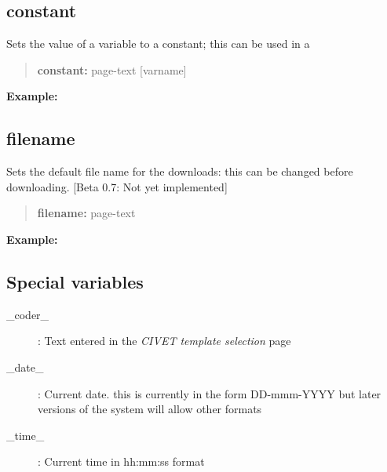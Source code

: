 \documentclass[letterpaper,10pt,english]{sphinxmanual}
\begin{document}
\subsection{constant}
\label{forms:constant}
Sets the value of a variable to a constant; this can be used in a
\begin{quote}

\begin{DUlineblock}{0em}
\item[] \textbf{constant:} page-text {[}varname{]}
\end{DUlineblock}
\end{quote}

\textbf{Example:}
\begin{quote}

\end{quote}


\subsection{filename}
\label{forms:filename}
Sets the default file name for the downloads: this can be changed before
downloading. {[}Beta 0.7: Not yet implemented{]}
\begin{quote}

\begin{DUlineblock}{0em}
\item[] \textbf{filename:} page-text
\end{DUlineblock}
\end{quote}

\textbf{Example:}
\begin{quote}

\end{quote}


\subsection{Special variables}
\label{forms:special-variables}\begin{description}
\item[{\_coder\_}] \leavevmode
: Text entered in the \emph{CIVET template selection} page

\item[{\_date\_}] \leavevmode
: Current date. this is currently in the form DD-mmm-YYYY but later
versions of the system will allow other formats

\item[{\_time\_}] \leavevmode
: Current time in hh:mm:ss format

\end{description}
\end{document}
